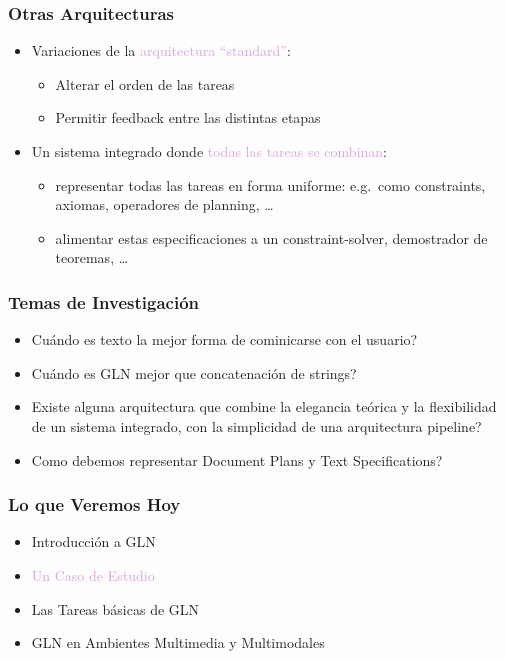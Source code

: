 \documentclass[compress,color=usenames]{beamer}
\newcommand{\mH}[1]{\textcolor{Plum}{#1}}
\begin{document}
\begin{frame}
\frametitle{Otras Arquitecturas}

\label{f60}
\begin{itemize}
\item { {Variaciones de la \mH{arquitectura ``standard''}:}}
\begin{itemize}
\item { {Alterar el orden de las tareas}}
\item { {Permitir feedback entre las distintas etapas}}
\end{itemize}
\item { {Un sistema integrado donde \mH{todas las tareas se combinan}:}}
\begin{itemize}
\item { {representar todas las tareas en forma uniforme: e.g.\ como constraints, axiomas, operadores de planning, \ldots}}
\item { {alimentar estas especificaciones a un  constraint-solver, demostrador de teoremas, \ldots}}
\end{itemize}
\end{itemize}
\end{frame}

\begin{frame}
\frametitle{Temas de Investigaci\'on}

\label{f62}
\begin{itemize}
\item { {Cu\'ando es texto la mejor forma de cominicarse con el usuario?}}
\item { {Cu\'ando es GLN mejor que concatenaci\'on de strings?}}
\item { {Existe alguna arquitectura que combine la elegancia te\'orica y la flexibilidad de un sistema integrado, con la simplicidad de una arquitectura pipeline?}}
\item { {Como debemos representar Document Plans y Text Specifications?}}
\end{itemize}

\end{frame}

\begin{frame}
\frametitle{Lo que Veremos Hoy}

\begin{itemize}
\item  Introducci\'on a GLN 
\item  \mH{Un Caso de Estudio}
\item  Las Tareas b\'asicas de GLN
\item  GLN en Ambientes Multimedia y Multimodales
\end{itemize}
\end{frame}
\end{document}
